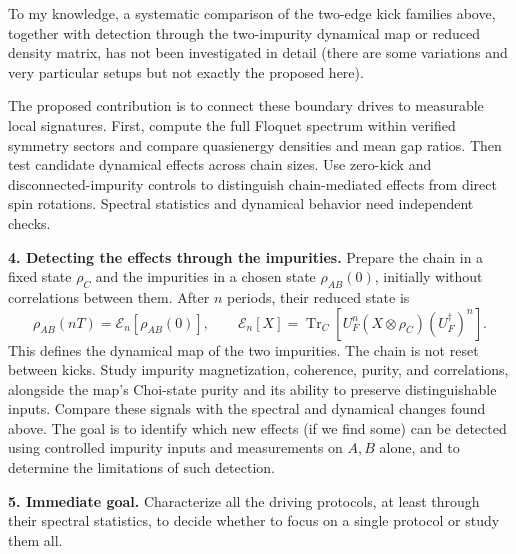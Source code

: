 \documentclass[10pt,a4paper]{article}
\begin{document}
To my knowledge, a systematic comparison of the two-edge kick families above, together with detection through the two-impurity dynamical map or reduced density matrix, has not been investigated in detail (there are some variations and very particular setups but not exactly the proposed here).

The proposed contribution is to connect these boundary drives to measurable local signatures.
First, compute the full Floquet spectrum within verified symmetry sectors and compare quasienergy densities and mean gap ratios.
Then test candidate dynamical effects across chain sizes.
Use zero-kick and disconnected-impurity controls to distinguish chain-mediated effects from direct spin rotations.
Spectral statistics and dynamical behavior need independent checks.

\textbf{4. Detecting the effects through the impurities.}
Prepare the chain in a fixed state $\rho_C$ and the impurities in a chosen state $\rho_{AB}(0)$, initially without correlations between them.
After $n$ periods, their reduced state is
\[
\rho_{AB}(nT)=\mathcal E_n[\rho_{AB}(0)],\qquad
\mathcal E_n[X]=\operatorname{Tr}_C
 \left[U_F^n(X\otimes\rho_C)(U_F^\dagger)^n\right].
\]
This defines the dynamical map of the two impurities. The chain is not reset between kicks.
Study impurity magnetization, coherence, purity, and correlations, alongside the map's Choi-state purity and its ability to preserve distinguishable inputs.
Compare these signals with the spectral and dynamical changes found above.
The goal is to identify which new effects (if we find some) can be detected using controlled impurity inputs and measurements on $A,B$ alone, and to determine the limitations of such detection.

\textbf{5. Immediate goal.}
Characterize all the driving protocols, at least through their spectral statistics, to decide whether to focus on a single protocol or study them all.
\end{document}
